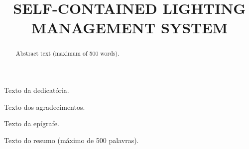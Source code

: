 \documentclass[openright]{normas-utf-tex} %
\title{\MakeUppercase{Self-contained lighting management system}} %
\begin{document}
\capa %
\folhaderosto %

\fichacatpgbib{\pageref{bibstart}-\pageref{bibend}}
\fichacat



\begin{dedicatoria}
Texto da dedicat\'oria.
\end{dedicatoria}

\begin{agradecimentos}
Texto dos agradecimentos.
\end{agradecimentos}

\begin{epigrafe}
Texto da ep\'igrafe.
\end{epigrafe}

\begin{resumo}
Texto do resumo (m\'aximo de 500 palavras).
\end{resumo}

\begin{abstract}
Abstract text (maximum of 500 words).
\end{abstract}

\listadefiguras %
\listadetabelas %
\listadequadros %
\listadesiglas %
\listadesimbolos %

\sumario %


%
%
%
%

\setcounter{page}{12}

\end{document}
